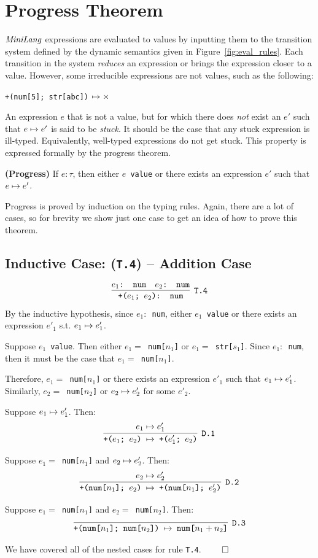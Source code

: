\section{Progress Theorem}
\label{sec:progress}
$\mathit{MiniLang}$ expressions are evaluated to values by
inputting them to the transition system defined
by the dynamic semantics given in Figure~\ref{fig:eval_rules}.
Each transition in the system \emph{reduces} an expression or
brings the expression closer to a value.
However, some irreducible expressions are not values, such as
the following:

\texttt{+(num[5]; str[abc])} $\mapsto \times$

An expression $e$ that is not a value, but for which there does
\emph{not} exist an $e'$ such that $e \mapsto e'$ is said to be \emph{stuck}.
It should be the case that any stuck expression is ill-typed.
Equivalently, well-typed expressions do not get stuck.
This property is expressed formally by the progress theorem.

\begin{thm}
\textbf{(Progress)}
If $e : \tau$, then either
\texttt{$e$ value} or there exists an expression $e'$ such
that $e \mapsto e'$.
\end{thm}

Progress is proved by induction on the typing rules.
Again, there are a lot of cases, so for brevity
we show just one case to get an idea of
how to prove this theorem.

\subsection{Inductive Case: (\texttt{T.4}) -- Addition Case}

\[
\cinfer[T.4]{+($e_1$; $e_2$): num}
  {\code{$e_1$: num} & \code{$e_2$: num}}
\]
By the inductive hypothesis,
since \texttt{$e_1:$ num}, either \texttt{$e_1$ value}
or there exists an expression $e'_1$ s.t.
$e_1 \mapsto e'_1$.

Suppose \texttt{$e_1$ value}. Then either
\texttt{$e_1=$  num[$n_1$]} or \texttt{$e_1=$  str[$s_1$]}.
Since \texttt{$e_1:$ num}, then it must be the case that
\texttt{$e_1=$  num[$n_1$]}.

Therefore, \texttt{$e_1=$  num[$n_1$]} or
there exists an expression $e'_1$ such that
$e_1 \mapsto e'_1$.
Similarly, \texttt{$e_2=$  num[$n_2$]} or
$e_2 \mapsto e'_2$ for some $e'_2$.

Suppose $e_1 \mapsto e'_1$. Then:
\[
\cinfer[D.1]{+($e_1$; $e_2$) $\stepto$ +($e'_1$; $e_2$)}{e_1 \stepto e'_1}
\]

Suppose \texttt{$e_1=$  num[$n_1$]} and $e_2 \mapsto e'_2$. Then:
\[
\cinfer[D.2]{+(num[$n_1$]; $e_2$) $\stepto$ +(num[$n_1$]; $e'_2$)}{e_2 \stepto e'_2}
\]

Suppose \texttt{$e_1=$  num[$n_1$]} and \texttt{$e_2=$  num[$n_2$]}. Then:
\[
\cinfer[D.3]{+(num[$n_1$]; num[$n_2$]) $\stepto$ num[$n_1 + n_2$]}{ }
\]

We have covered all of the nested cases for rule \texttt{T.4}. $\qed$
